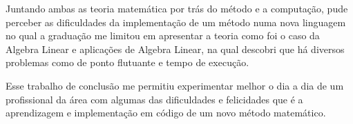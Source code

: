  Juntando ambas as teoria matemática por trás do método e a computação, pude perceber as dificuldades da implementação de um método numa nova linguagem no qual a graduação me limitou em apresentar a teoria como foi o caso da Algebra Linear e aplicações de Algebra Linear, na qual descobri que há diversos problemas como de ponto flutuante e tempo de execução.
 
 Esse trabalho de conclusão me permitiu experimentar melhor o dia a dia de um profissional da área com algumas das dificuldades e felicidades que é a aprendizagem e implementação em código de um novo método matemático.
 